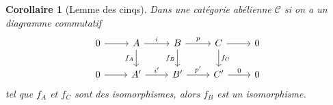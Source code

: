 \documentclass[a4paper,12pt]{book}
\newcommand{\Cat}{\mathcal{C}}
\theoremstyle{plain}
\newtheorem{cor}[subsection]{Corollaire}
\theoremstyle{definition}
\theoremstyle{remark}
\begin{document}
\begin{cor}[Lemme des cinqs]
    Dans une catégorie abélienne $\Cat$ si on a un diagramme commutatif
\[\begin{tikzcd}
	0 & A & B & C & 0 \\
	0 & {A'} & {B'} & {C'} & 0
	\arrow[from=1-1, to=1-2]
	\arrow["i", from=1-2, to=1-3]
	\arrow["{f_A}"', from=1-2, to=2-2]
	\arrow["p", from=1-3, to=1-4]
	\arrow["{f_B}"', from=1-3, to=2-3]
	\arrow[from=1-4, to=1-5]
	\arrow["{f_C}", from=1-4, to=2-4]
	\arrow[from=2-1, to=2-2]
	\arrow["{i'}", from=2-2, to=2-3]
	\arrow["{p'}", from=2-3, to=2-4]
	\arrow["0", from=2-4, to=2-5]
\end{tikzcd}\]
    tel que $f_A$ et $f_C$ sont des isomorphismes, alors $f_B$ est un
    isomorphisme.
\end{cor}
\end{document}
